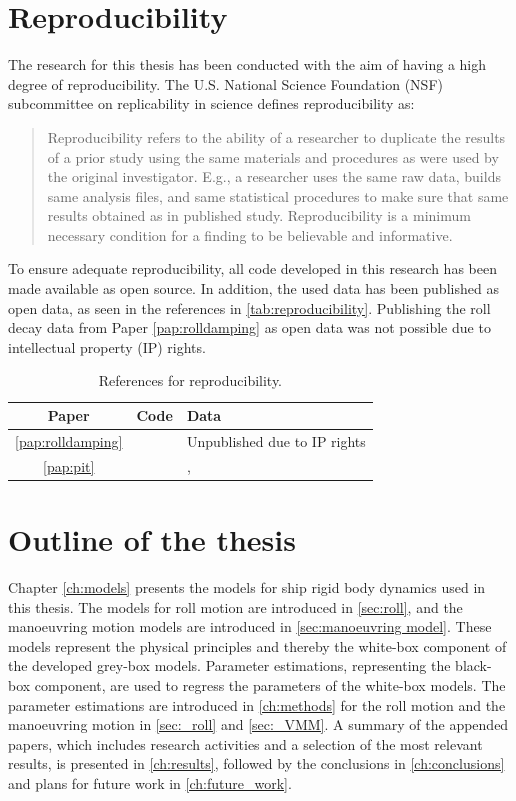 \section{Reproducibility}
The research for this thesis has been conducted with the aim of having a high degree of reproducibility. The U.S. National Science Foundation (NSF) subcommittee on replicability in science defines reproducibility as:
\begin{quote}
Reproducibility refers to the ability of a researcher to duplicate the results of a prior study
using the same materials and procedures as were used by the original
investigator. 
E.g., a researcher uses the same raw data, builds same analysis files,
and same statistical procedures to make sure that same results
obtained as in published study. Reproducibility is a minimum necessary condition for a finding to be
believable and informative. 
    \cite{bollen_reproducibility_2015}
\end{quote}

\noindent To ensure adequate reproducibility, all code developed in this research has been made available as open source. In addition, the used data has been published as open data, as seen in the references in \autoref{tab:reproducibility}. Publishing the roll decay data from Paper \ref{pap:rolldamping} as open data was not possible due to intellectual property (IP) rights.

\begin{table}[H]
    \centering
    \caption{References for reproducibility.}
    \label{tab:reproducibility}
    \begin{tabular}{ c l l}
        \toprule
         Paper &  Code & Data \\
         \hline
         \ref{pap:rolldamping} & \textcite{alexandersson_rolldecay-estimators_2022} & Unpublished due to IP rights\\
         \ref{pap:pit} & \textcite{alexandersson_code_2022} & \textcite{alexandersson_wpcc_2022}, \textcite{stern_experience_2011} \\
         \bottomrule
    \end{tabular}
\end{table}

\section{Outline of the thesis}
Chapter \ref{ch:models} presents the models for ship rigid body dynamics used in this thesis. The models for roll motion are introduced in \autoref{sec:roll}, and the manoeuvring motion models are introduced in  \autoref{sec:manoeuvring model}. These models represent the physical principles and thereby the white-box component of the developed grey-box models.
Parameter estimations, representing the black-box component, are used to regress the parameters of the white-box models. The parameter estimations are introduced in \autoref{ch:methods} for the roll motion and the manoeuvring motion in \autoref{sec:_roll} and \autoref{sec:_VMM}. 
A summary of the appended papers, which includes research activities and a selection of the most relevant results, is presented in \autoref{ch:results}, followed by the conclusions in \autoref{ch:conclusions} and plans for future work in \autoref{ch:future_work}.